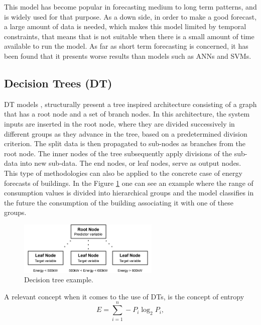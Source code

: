 This model has become popular in forecasting medium to long term patterns, and is widely used for that purpose. As a down side, in order to make a good forecast, a large amount of data is needed, which makes this model limited by temporal constraints, that means that is not suitable when there is a small amount of time available to run the model. As far as short term forecasting is concerned, it has been found that it presents worse results than models such as \ac{ANNs} and \ac{SVM}s.

\subsection{Decision Trees (DT)}

\ac{DT} models \cite{dt1}, structurally present a tree inspired architecture consisting of a graph that has a root node and a set of branch nodes. In this architecture, the system inputs are inserted in the root node, where they are divided successively in different groups as they advance in the tree, based on a predetermined division criterion. The split data is then propagated to sub-nodes as branches from the root node. The inner nodes of the tree subsequently apply divisions of the sub-data into new sub-data. The end nodes, or leaf nodes, serve as output nodes. This type of methodologies can also be applied to the concrete case of energy forecasts of buildings. In the Figure \ref{dt} one can see an example where the range of consumption values is divided into hierarchical groups and the model classifies in the future the consumption of the building associating it with one of these groups.


\begin{figure}[h!]
    \centering
    \begin{center}
    \includegraphics[width=0.6\textwidth]{Images/DT.png}
    \caption{Decision tree example.}
    \label{dt}
    \end{center}
\end{figure}

A relevant concept when it comes to the use of \ac{DT}s, is the concept of entropy
\begin{equation}
       E=\sum_{i=1}^n -P_i\log_2P_i,
\label{entropy}
\end{equation}

